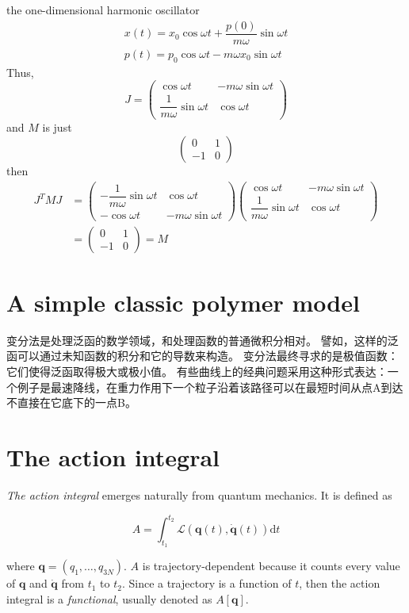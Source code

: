 \documentclass[
  10pt,
  twoside,
  openany,
  b5paper, %
  colorscheme = bootstrap-v4, %
]{qyxf-book}
\numberwithin{equation}{section}
\newcommand{\vq}{\boldsymbol{q}}
\newcommand{\dvq}{\dot{\vq}}
\newcommand{\dt}{\mathrm{d}t}
\newcommand{\lag}{\mathcal{L}} %
\newcommand{\inttot}{\int_{t_1}^{t_2}}
\begin{document}
\example the one-dimensional harmonic oscillator
\begin{gather*}
	x(t)=x_0\cos\omega t+\dfrac{p(0)}{m\omega}\sin\omega t\\
	p(t)=p_0\cos\omega t-m\omega x_0\sin\omega t
\end{gather*}
Thus, 
\begin{equation*}
	J=\begin{pmatrix}
		\cos\omega t & -m\omega\sin\omega t \\
		\dfrac{1}{m\omega}\sin\omega t & \cos\omega t
	\end{pmatrix}
\end{equation*}
and $M$ is just
\begin{equation*}
	\begin{pmatrix}
		0 & 1 \\
		-1 & 0
	\end{pmatrix}
\end{equation*}
then
\begin{align*}
	J^TMJ&=
	\begin{pmatrix}
		-\dfrac{1}{m\omega}\sin\omega t & \cos\omega t \\
		-\cos\omega t & -m\omega\sin\omega t
	\end{pmatrix}
	\begin{pmatrix}
		\cos\omega t & -m\omega\sin\omega t \\
		\dfrac{1}{m\omega}\sin\omega t & \cos\omega t
	\end{pmatrix}\\
	&=\begin{pmatrix}
		0 & 1 \\
		-1 & 0
	\end{pmatrix} = M
\end{align*}

\section{A simple classic polymer model}
变分法是处理泛函的数学领域，和处理函数的普通微积分相对。 譬如，这样的泛函可以通过未知函数的积分和它的导数来构造。 变分法最终寻求的是极值函数：它们使得泛函取得极大或极小值。 有些曲线上的经典问题采用这种形式表达：一个例子是最速降线，在重力作用下一个粒子沿着该路径可以在最短时间从点A到达不直接在它底下的一点B。

\section{The action integral}
\textit{The action integral} emerges naturally from quantum mechanics. It is defined as
\begin{tcolorbox}
	\begin{equation}
		A=\inttot\lag\left(\vq(t),\dvq(t)\right)\dt
	\end{equation}
\end{tcolorbox}
where $\vq=(q_1,\dots,q_{3N})$. $A$ is trajectory-dependent because it counts every value of $\vq$ and $\dvq$ from $t_1$ to $t_2$. Since a trajectory is a function of $t$, then the action integral is a \textit{functional}, usually denoted as $A\left[\vq\right]$.
\end{document}
